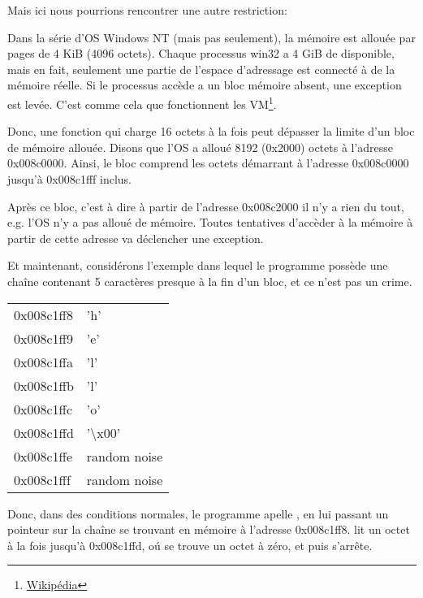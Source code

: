 Mais ici nous pourrions rencontrer une autre restriction:

\newcommand{\URLPAGE}{\href{http://go.yurichev.com/17136}{Wikipédia}}

Dans la série d'\ac{OS} \gls{Windows NT} (mais pas seulement), la mémoire est allouée
par pages de 4 KiB (4096 octets).
Chaque processus win32 a 4 GiB de disponible, mais en fait, seulement une partie
de l'espace d'adressage est connecté à de la mémoire réelle.
Si le processus accède a un bloc mémoire absent, une exception est levée.
C'est comme cela que fonctionnent les \ac{VM}\footnote{\URLPAGE}.

Donc, une fonction qui charge 16 octets à la fois peut dépasser la limite d'un bloc
de mémoire allouée.
Disons que l'\ac{OS} a alloué 8192 (0x2000) octets à l'adresse 0x008c0000.
Ainsi, le bloc comprend les octets démarrant à l'adresse 0x008c0000 jusqu'à 0x008c1fff
inclus.

Après ce bloc, c'est à dire à partir de l'adresse 0x008c2000 il n'y a rien du tout,
e.g. l'\ac{OS} n'y a pas alloué de mémoire.
Toutes tentatives d'accèder à la mémoire à partir de cette adresse va déclencher
une exception.

Et maintenant, considérons l'exemple dans lequel le programme possède une chaîne
contenant 5 caractères presque à la fin d'un bloc, et ce n'est pas un crime.

\begin{center}
  \begin{tabular}{ | l | l | }
    \hline
        0x008c1ff8 & 'h' \\
        0x008c1ff9 & 'e' \\
        0x008c1ffa & 'l' \\
        0x008c1ffb & 'l' \\
        0x008c1ffc & 'o' \\
        0x008c1ffd & '\textbackslash{}x00' \\
        0x008c1ffe & random noise \\
        0x008c1fff & random noise \\
    \hline
  \end{tabular}
\end{center}

Donc, dans des conditions normales, le programme apelle \strlen, en lui passant un
pointeur sur la chaîne  se trouvant en mémoire à l'adresse 0x008c1ff8.
\strlen lit un octet à la fois jusqu'à 0x008c1ffd, oú se trouve un octet à zéro,
et puis s'arrête.

